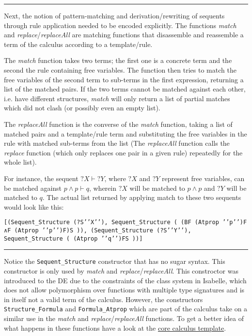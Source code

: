 \begin{center}\rule{3in}{0.4pt}\end{center}

Next, the notion of pattern-matching and derivation/rewriting of
sequents through rule application needed to be encoded explicitly. The
functions \emph{match} and \emph{replace}/\emph{replaceAll} are matching
functions that disassemble and reassemble a term of the calculus
according to a template/rule.

The \emph{match} function takes two terms; the first one is a concrete
term and the second the rule containing free variables. The function
then tries to match the free variables of the second term to sub-terms
in the first expression, returning a list of the matched pairs. If the
two terms cannot be matched against each other, i.e. have different
structures, \emph{match} will only return a list of partial matches
which did not clash (or possibly even an empty list).

The \emph{replaceAll} function is the converse of the \emph{match}
function, taking a list of matched pairs and a template/rule term and
substituting the free variables in the rule with matched sub-terms from
the list (The \emph{replaceAll} function calls the \emph{replace}
function (which only replaces one pair in a given rule) repeatedly for
the whole list).

For instance, the sequent $?X \vdash ?Y$, where $?X$
and $?Y$ represent free variables, can be matched against $p
\land p \vdash q$, wherein $?X$ will be
matched to $p \land p$ and $?Y$ will be matched to
$q$. The actual list returned by applying match to these two sequents
would look like this:

\begin{verbatim}
[(Sequent_Structure (?S’’X’’), Sequent_Structure ( (BF (Atprop ’’p’’)F ∧F (Atprop ’’p’’)F)S )), (Sequent_Structure (?S’’Y’’), Sequent_Structure ( (Atprop ’’q’’)FS ))]
\end{verbatim}

\begin{center}\rule{3in}{0.4pt}\end{center}

Notice the \texttt{Sequent\_Structure} constructor that has no sugar
syntax. This constructor is only used by \emph{match} and
\emph{replace}/\emph{replaceAll}. This constroctor was introduced to the
DE due to the constraints of the class system in Isabelle, which does
not allow polymorphism over functions with multiple type signatures and
is in itself not a valid term of the calculus. However, the constructors
\texttt{Structure\_Formula} and \texttt{Formula\_Atprop} which are part
of the calculus take on a similar use in the \emph{match} and
\emph{replace}/\emph{replaceAll} functions. To get a better idea of what
happens in these functions have a look at the
\href{https://github.com/goodlyrottenapple/calculus-toolbox/blob/master/template/Calc_Core.thy}{core
calculus template}.

